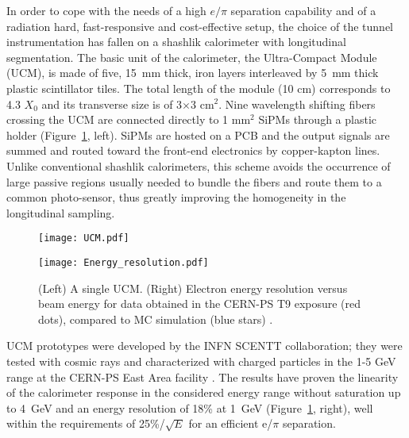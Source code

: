 \documentclass[12pt]{article}
\begin{document}
In order to cope with the needs of a high $e/\pi$ separation capability
and of a radiation hard, fast-responsive and cost-effective setup, the choice of the tunnel instrumentation
has fallen on a shashlik calorimeter with longitudinal segmentation. The basic unit of the calorimeter, the Ultra-Compact Module (UCM),
is made of five, 15~mm thick, iron layers interleaved by 5~mm thick plastic scintillator tiles. The total length of the module
(10 cm) corresponds to 4.3 $X_0$ and its transverse size is of 3$\times$3 cm$^2$. Nine wavelength shifting fibers crossing the
UCM are connected directly to 1 mm$^2$ SiPMs through a plastic holder (Figure~\ref{fig:UCM}, left).
SiPMs are hosted on a PCB and the output signals are summed and routed toward the front-end electronics by copper-kapton lines.
Unlike conventional
shashlik calorimeters, this scheme avoids the occurrence of large passive regions usually needed to bundle the fibers and route
them to a common photo-sensor, thus greatly improving the homogeneity in the longitudinal sampling.


\begin{figure}[htb]
\centering
\begin{minipage}[t]{0.45\textwidth}
\texttt{[image: UCM.pdf]}
\end{minipage}
\hspace{10mm}
\begin{minipage}[t]{0.45\textwidth}
\texttt{[image: Energy\_resolution.pdf]}
\end{minipage}
\caption{(Left) A single UCM. (Right) Electron energy resolution versus beam energy for data obtained in the CERN-PS T9
exposure (red dots), compared to MC simulation (blue stars) \cite{TB2016}.}
\label{fig:UCM}
\end{figure}

UCM prototypes were developed by the INFN SCENTT collaboration;
they were tested with cosmic rays and characterized with charged particles in the 1-5 GeV range at the
CERN-PS East Area facility \cite{TB2015,TB2016}. The results have proven the linearity of the calorimeter response
in the considered energy range without saturation up to 4~GeV and an energy resolution of 18\% at 1~GeV 
(Figure~\ref{fig:UCM}, right), well within the requirements of 25\%/$\sqrt E$ for an efficient e/$\pi$ separation.
\end{document}
